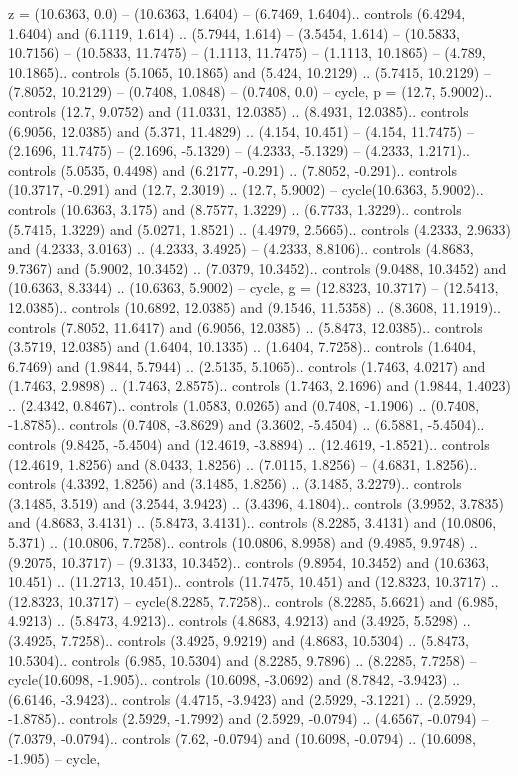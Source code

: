 {z} = {(10.6363, 0.0) -- (10.6363, 1.6404) -- (6.7469, 1.6404).. controls (6.4294, 1.6404) and (6.1119, 1.614) .. (5.7944, 1.614) -- (3.5454, 1.614) -- (10.5833, 10.7156) -- (10.5833, 11.7475) -- (1.1113, 11.7475) -- (1.1113, 10.1865) -- (4.789, 10.1865).. controls (5.1065, 10.1865) and (5.424, 10.2129) .. (5.7415, 10.2129) -- (7.8052, 10.2129) -- (0.7408, 1.0848) -- (0.7408, 0.0) -- cycle},
{p} = {(12.7, 5.9002).. controls (12.7, 9.0752) and (11.0331, 12.0385) .. (8.4931, 12.0385).. controls (6.9056, 12.0385) and (5.371, 11.4829) .. (4.154, 10.451) -- (4.154, 11.7475) -- (2.1696, 11.7475) -- (2.1696, -5.1329) -- (4.2333, -5.1329) -- (4.2333, 1.2171).. controls (5.0535, 0.4498) and (6.2177, -0.291) .. (7.8052, -0.291).. controls (10.3717, -0.291) and (12.7, 2.3019) .. (12.7, 5.9002) -- cycle(10.6363, 5.9002).. controls (10.6363, 3.175) and (8.7577, 1.3229) .. (6.7733, 1.3229).. controls (5.7415, 1.3229) and (5.0271, 1.8521) .. (4.4979, 2.5665).. controls (4.2333, 2.9633) and (4.2333, 3.0163) .. (4.2333, 3.4925) -- (4.2333, 8.8106).. controls (4.8683, 9.7367) and (5.9002, 10.3452) .. (7.0379, 10.3452).. controls (9.0488, 10.3452) and (10.6363, 8.3344) .. (10.6363, 5.9002) -- cycle},
{g} = {(12.8323, 10.3717) -- (12.5413, 12.0385).. controls (10.6892, 12.0385) and (9.1546, 11.5358) .. (8.3608, 11.1919).. controls (7.8052, 11.6417) and (6.9056, 12.0385) .. (5.8473, 12.0385).. controls (3.5719, 12.0385) and (1.6404, 10.1335) .. (1.6404, 7.7258).. controls (1.6404, 6.7469) and (1.9844, 5.7944) .. (2.5135, 5.1065).. controls (1.7463, 4.0217) and (1.7463, 2.9898) .. (1.7463, 2.8575).. controls (1.7463, 2.1696) and (1.9844, 1.4023) .. (2.4342, 0.8467).. controls (1.0583, 0.0265) and (0.7408, -1.1906) .. (0.7408, -1.8785).. controls (0.7408, -3.8629) and (3.3602, -5.4504) .. (6.5881, -5.4504).. controls (9.8425, -5.4504) and (12.4619, -3.8894) .. (12.4619, -1.8521).. controls (12.4619, 1.8256) and (8.0433, 1.8256) .. (7.0115, 1.8256) -- (4.6831, 1.8256).. controls (4.3392, 1.8256) and (3.1485, 1.8256) .. (3.1485, 3.2279).. controls (3.1485, 3.519) and (3.2544, 3.9423) .. (3.4396, 4.1804).. controls (3.9952, 3.7835) and (4.8683, 3.4131) .. (5.8473, 3.4131).. controls (8.2285, 3.4131) and (10.0806, 5.371) .. (10.0806, 7.7258).. controls (10.0806, 8.9958) and (9.4985, 9.9748) .. (9.2075, 10.3717) -- (9.3133, 10.3452).. controls (9.8954, 10.3452) and (10.6363, 10.451) .. (11.2713, 10.451).. controls (11.7475, 10.451) and (12.8323, 10.3717) .. (12.8323, 10.3717) -- cycle(8.2285, 7.7258).. controls (8.2285, 5.6621) and (6.985, 4.9213) .. (5.8473, 4.9213).. controls (4.8683, 4.9213) and (3.4925, 5.5298) .. (3.4925, 7.7258).. controls (3.4925, 9.9219) and (4.8683, 10.5304) .. (5.8473, 10.5304).. controls (6.985, 10.5304) and (8.2285, 9.7896) .. (8.2285, 7.7258) -- cycle(10.6098, -1.905).. controls (10.6098, -3.0692) and (8.7842, -3.9423) .. (6.6146, -3.9423).. controls (4.4715, -3.9423) and (2.5929, -3.1221) .. (2.5929, -1.8785).. controls (2.5929, -1.7992) and (2.5929, -0.0794) .. (4.6567, -0.0794) -- (7.0379, -0.0794).. controls (7.62, -0.0794) and (10.6098, -0.0794) .. (10.6098, -1.905) -- cycle},
